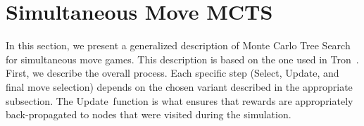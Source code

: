 \documentclass[conference]{IEEEtran}
\newcommand{\cT}{\mathcal{T}}
\newcommand{\ie}{{\it i.e.,}~}
\begin{document}


\section{Simultaneous Move MCTS}
\label{sec:smmcts}

\newcommand{\SMMCTS}{{\sc SM-MCTS}}
\newcommand{\ExpReq}{{\sc ExpansionRequired}}
\newcommand{\Update}{{\sc Update}}
\newcommand{\Select}{{\sc Select}}
\newcommand{\Playout}{{\sc Playout}}
\newcommand{\Max}{\text{Max}}
\newcommand{\Min}{\text{Min}}


In this section, we present a generalized description of Monte Carlo Tree Search for simultaneous move games. This 
description is based on the one used in Tron~\cite{Perick12Comparison}. First, we describe the overall process. 
Each specific step (\Select, \Update, and final move selection) depends on the chosen variant described in the 
appropriate subsection. The \Update~function is what ensures that rewards are appropriately back-propagated 
to nodes that were visited during the simulation. 
\end{document}
